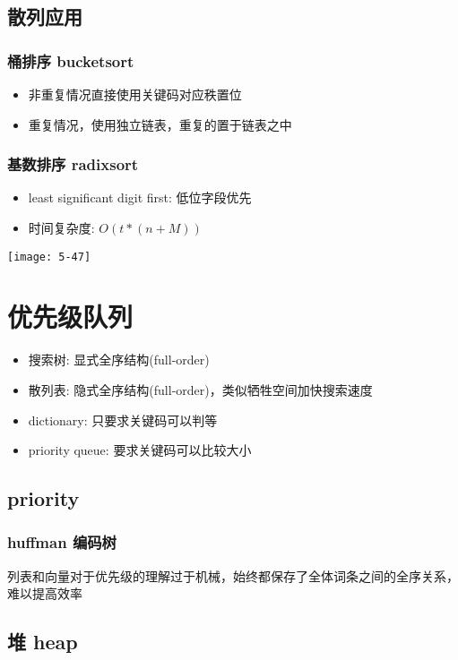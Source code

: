 \section{散列应用}
\subsection{桶排序 bucketsort}
\begin{itemize}
\item 非重复情况直接使用关键码对应秩置位
\item 重复情况，使用独立链表，重复的置于链表之中
\end{itemize}

\subsection{基数排序 radixsort}
\begin{itemize}
\item least significant digit first: 低位字段优先
\item 时间复杂度: $O(t*(n+M))$
\end{itemize}

\texttt{[image: 5-47]}

\chapter{优先级队列}
\begin{itemize}
\item 搜索树: 显式全序结构(full-order)
\item 散列表: 隐式全序结构(full-order)，类似牺牲空间加快搜索速度
\item dictionary: 只要求关键码可以判等
\item priority queue: 要求关键码可以比较大小
\end{itemize}

\section{priority}
\subsection{huffman 编码树}
列表和向量对于优先级的理解过于机械，始终都保存了全体词条之间的全序关系，难以提高效率

\section{堆 heap}
